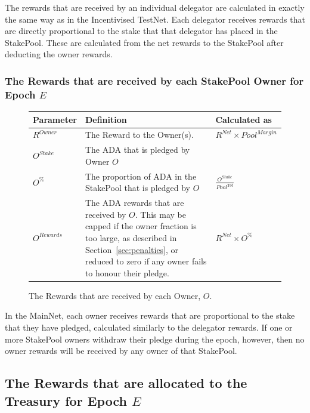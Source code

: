 \documentclass[11pt,a4paper,dvipsnames,twosided,final]{article}
\newcommand{\ada}{ADA{}}
\begin{document}
\noindent
The rewards that are received by an individual delegator are calculated in exactly the same way as in
the Incentivised TestNet.  Each delegator receives rewards that are directly proportional to the
stake that that delegator has placed in the StakePool.  These are calculated from the net rewards to the
StakePool after deducting the owner rewards.

\subsubsection*{The Rewards that are received by each StakePool Owner for Epoch $E$}

\begin{figure}[h!]
\begin{center}
\begin{tabular}{||l|p{9cm}|l||}
  \hline \hline
\textbf{Parameter}  & \textbf{Definition} & \textbf{Calculated as} \\\hline
$R^\textit{Owner}$ & The Reward to the Owner(s).  & $R^{\textit{Net}} \times {\textit{Pool}}^{\textit{Margin}}$ \\\hline
$O^\textit{Stake}$ & The \ada{} that is pledged by Owner $O$ & \\\hline
$O^\%$ & The proportion of \ada{} in the StakePool that is pledged by $O$ & $\frac{O^{Stake}}{Pool^{Tot}}$ \\\hline
$O^{Rewards}$ & The \ada{} rewards that are received by $O$. This may be capped if the owner fraction is too large,
as described in Section~\ref{sec:penalties}, or reduced to zero if any owner fails to honour their pledge. & $R^{\textit{Net}} \times O^\%$ \\\hline
\hline
\end{tabular}
\end{center}
\caption{The Rewards that are received by each Owner, $O$.}
\end{figure}

\noindent
In the MainNet, each owner receives rewards that are proportional to the stake that they have pledged,
calculated similarly to the delegator rewards.  If one or more StakePool owners withdraw their pledge during the epoch,
however, then no owner rewards will be received by any owner of that StakePool.


\clearpage
\subsection{The Rewards that are allocated to the Treasury for Epoch $E$}
\end{document}
